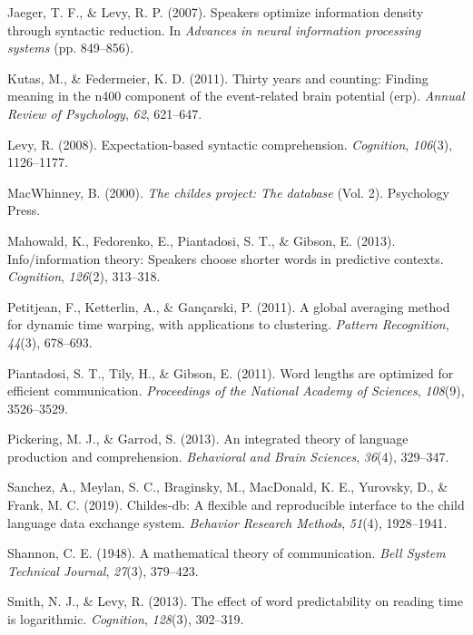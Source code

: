 \documentclass[10pt, letterpaper]{article}
\begin{document}
\leavevmode\hypertarget{ref-jaeger2007}{}%
Jaeger, T. F., \& Levy, R. P. (2007). Speakers optimize information
density through syntactic reduction. In \emph{Advances in neural
information processing systems} (pp. 849--856).

\leavevmode\hypertarget{ref-kutas2011}{}%
Kutas, M., \& Federmeier, K. D. (2011). Thirty years and counting:
Finding meaning in the n400 component of the event-related brain
potential (erp). \emph{Annual Review of Psychology}, \emph{62},
621--647.

\leavevmode\hypertarget{ref-levy2008}{}%
Levy, R. (2008). Expectation-based syntactic comprehension.
\emph{Cognition}, \emph{106}(3), 1126--1177.

\leavevmode\hypertarget{ref-macwhinney2000}{}%
MacWhinney, B. (2000). \emph{The childes project: The database} (Vol.
2). Psychology Press.

\leavevmode\hypertarget{ref-mahowald2013}{}%
Mahowald, K., Fedorenko, E., Piantadosi, S. T., \& Gibson, E. (2013).
Info/information theory: Speakers choose shorter words in predictive
contexts. \emph{Cognition}, \emph{126}(2), 313--318.

\leavevmode\hypertarget{ref-petitjean2011}{}%
Petitjean, F., Ketterlin, A., \& Gançarski, P. (2011). A global
averaging method for dynamic time warping, with applications to
clustering. \emph{Pattern Recognition}, \emph{44}(3), 678--693.

\leavevmode\hypertarget{ref-piantadosi2011}{}%
Piantadosi, S. T., Tily, H., \& Gibson, E. (2011). Word lengths are
optimized for efficient communication. \emph{Proceedings of the National
Academy of Sciences}, \emph{108}(9), 3526--3529.

\leavevmode\hypertarget{ref-pickering2013}{}%
Pickering, M. J., \& Garrod, S. (2013). An integrated theory of language
production and comprehension. \emph{Behavioral and Brain Sciences},
\emph{36}(4), 329--347.

\leavevmode\hypertarget{ref-sanchez2019}{}%
Sanchez, A., Meylan, S. C., Braginsky, M., MacDonald, K. E., Yurovsky,
D., \& Frank, M. C. (2019). Childes-db: A flexible and reproducible
interface to the child language data exchange system. \emph{Behavior
Research Methods}, \emph{51}(4), 1928--1941.

\leavevmode\hypertarget{ref-shannon1948}{}%
Shannon, C. E. (1948). A mathematical theory of communication.
\emph{Bell System Technical Journal}, \emph{27}(3), 379--423.

\leavevmode\hypertarget{ref-smith2013}{}%
Smith, N. J., \& Levy, R. (2013). The effect of word predictability on
reading time is logarithmic. \emph{Cognition}, \emph{128}(3), 302--319.
\end{document}
